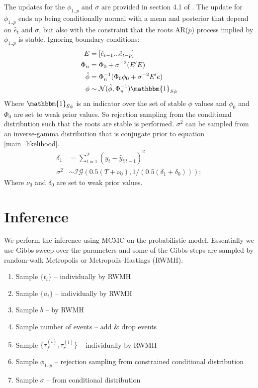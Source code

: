 \documentclass{article}
\begin{document}
The updates for the $\phi_{1..p}$ and $\sigma$ are provided in section 4.1 of \cite{chib1994bayes}. The update for $\phi_{1..p}$ ends up being conditionally normal with a mean and posterior that depend on $\hat e_t$ and $\sigma$, but also with the constraint that the roots AR($p$) process implied by $\phi_{1..p}$ is stable.  Ignoring boundary conditions:
\begin{align}
E &= [\hat e_{t-1} ... \hat e_{t-p}] \\
\Phi_n &= \Phi_0 + \sigma^{-2}(E'E) \\
\hat \phi &= \Phi_n^{-1} (\Phi_0 \phi_0 + \sigma^{-2} E'e) \\
\phi &\sim \mathcal{N}(\hat \phi,\Phi_n^{-1})\mathbbm{1}_{S \phi}
\end{align}
Where $\mathbbm{1}_{S \phi}$ is an indicator over the set of stable $\phi$ values and $\phi_0$ and $\Phi_0$ are set to weak prior values.
So rejection sampling from the conditional distribution such that the roots are stable is performed.  
$\sigma^2$ can be sampled from an inverse-gamma distribution that is conjugate prior to equation \ref{main_likelihood}.
\begin{align}
\delta_1 &= \sum_{t=1}^T (y_t - \hat y_{t|t-1})^2 \\
\sigma^2 &\sim \mathcal{IG}(0.5 (T + \nu_0),1/(0.5 (\delta_1 + \delta_0)));
\end{align}
Where $\nu_0$ and $\delta_0$ are set to weak prior values.

\section*{Inference}

We perform the inference using MCMC on the probabilistic model.  Essentially we use Gibbs sweep over the parameters and some of the Gibbs steps are sampled by random-walk Metropolis or Metropolis-Hastings (RWMH).

\begin{enumerate}
\item Sample $\{t_i\}$ -- individually by RWMH
\item Sample $\{a_i\}$ -- individually by RWMH
\item Sample $b$ -- by RWMH
\item Sample number of events -- add \& drop events
\item Sample $\{\tau_f^{(i)}, \tau_r^{(i)}\}$ -- individually by RWMH
\item Sample $\phi_{1..p}$ -- rejection sampling from constrained conditional distribution
\item Sample $\sigma$ -- from conditional distribution
\end{enumerate}
\end{document}
